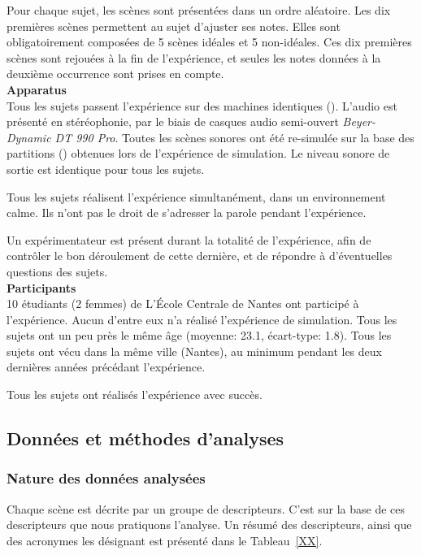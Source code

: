 Pour chaque sujet, les scènes sont présentées dans un ordre aléatoire. Les dix premières scènes permettent au sujet d'ajuster ses notes. Elles sont obligatoirement composées de 5 scènes idéales et 5 non-idéales. Ces dix premières scènes sont rejouées à la fin de l'expérience, et seules les notes données à la deuxième occurrence sont prises en compte. \\

\textbf{Apparatus} \\

Tous les sujets passent l'expérience sur des machines identiques (). L'audio est présenté en stéréophonie, par le biais de casques audio semi-ouvert \emph{Beyer-Dynamic DT 990 Pro}. Toutes les scènes sonores ont été re-simulée sur la base des partitions () obtenues lors de l'expérience de simulation. Le niveau sonore de sortie est identique pour tous les sujets.

Tous les sujets réalisent l'expérience simultanément, dans un environnement calme. Ils n'ont pas le droit de s'adresser la parole pendant l'expérience.

Un expérimentateur est présent durant la totalité de l'expérience, afin de contrôler le bon déroulement de cette dernière, et de répondre à d'éventuelles questions des sujets.  \\

\textbf{Participants} \\

10 étudiants (2 femmes) de L’École Centrale de Nantes ont participé à l'expérience. Aucun d'entre eux n'a réalisé l'expérience de simulation. Tous les sujets ont un peu près le même âge (moyenne: 23.1, écart-type: 1.8). Tous les sujets ont vécu dans la même ville (Nantes), au minimum pendant les deux dernières années précédant l'expérience.

Tous les sujets ont réalisés l'expérience avec succès.

\subsection{Données et méthodes d'analyses}

\subsubsection{Nature des données analysées}

Chaque scène est décrite par un groupe de descripteurs. C'est sur la base de ces descripteurs que nous pratiquons l'analyse. Un résumé des descripteurs, ainsi que des acronymes les désignant est présenté dans le Tableau~\ref{XX}.

